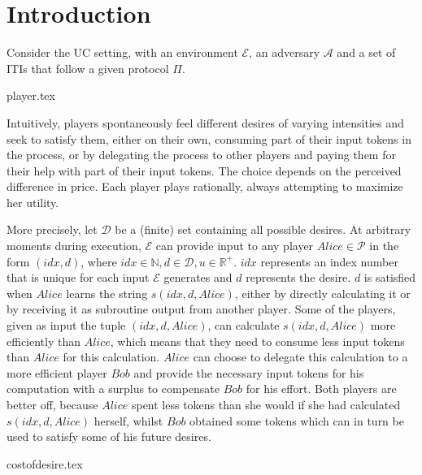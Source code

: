 \section{Introduction}
  Consider the UC setting, with an environment $\mathcal{E}$, an adversary $\mathcal{A}$ and a set of ITIs that follow a
  given protocol $\Pi$.

  {player.tex}

  Intuitively, players spontaneously feel different desires of varying intensities and seek to satisfy them, either on their
  own, consuming part of their input tokens in the process, or by delegating the process to other players and paying them for
  their help with part of their input tokens. The choice depends on the perceived difference in price. Each player plays
  rationally, always attempting to maximize her utility.
  
  More precisely, let $\mathcal{D}$ be a (finite) set containing all possible desires. At arbitrary moments during execution,
  $\mathcal{E}$ can provide input to any player $Alice \in \mathcal{P}$ in the form $\left(idx, d\right)$, where $idx \in
  \mathbb{N}, d \in \mathcal{D}, u \in \mathbb{R}^{+}$. $idx$ represents an index number that is unique for each input
  $\mathcal{E}$ generates and $d$ represents the desire. $d$ is satisfied when $Alice$ learns the string $s\left(idx, d,
  Alice\right)$, either by directly calculating it or by receiving it as subroutine output from another player. Some of the
  players, given as input the tuple $\left(idx, d, Alice\right)$, can calculate $s\left(idx, d, Alice\right)$ more efficiently
  than $Alice$, which means that they need to consume less input tokens than $Alice$ for this calculation. $Alice$ can choose
  to delegate this calculation to a more efficient player $Bob$ and provide the necessary input tokens for his computation with
  a surplus to compensate $Bob$ for his effort. Both players are better off, because $Alice$ spent less tokens than she would
  if she had calculated $s\left(idx, d, Alice\right)$ herself, whilst $Bob$ obtained some tokens which can in turn be used to
  satisfy some of his future desires.

  {costofdesire.tex}

